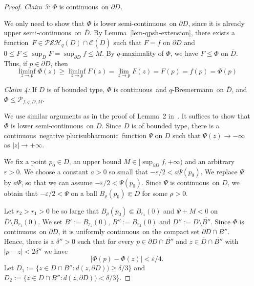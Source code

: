 \documentclass[reqno]{amsart}
\theoremstyle{definition}
\numberwithin{equation}{section}
\newcommand{\TP}[1]{\textcolor{red}{[#1]}}
\newcommand{\ccal}{\mathcal{C}}
\newcommand{\pcal}{\mathcal{P}}
\newcommand{\qbrem}{$q$-Bremermann}
\newcommand{\psh}{pluri\-sub\-harmonic}
\newcommand{\qpsh}{$q$-pluri\-sub\-harmonic}
\newcommand{\PSH}{\mathcal{PSH}}
\newcommand{\cl}[1]{\overline{#1}}
\newcommand{\cont}{continuous}
\newcommand{\usc}{upper semi-continuous}
\newcommand{\lsc}{lower semi-continuous}
\newcommand{\fct}{function}
\newcommand{\cld}{\overline{D}}
\newcommand{\relc}{\Subset}
\newcommand{\eps}{\varepsilon}
\begin{document}
\begin{proof}
\medskip

\textit{Claim 3:} $\Phi$ is \cont\ on $\partial D$.

\medskip

We only need to show that $\Phi$ is \lsc\ on $\partial D$, since it is already \usc\ on $\cld$. By Lemma~\ref{lem-qpsh-extension}, there exists a \fct\ $F \in \PSH_q(D)\cap\ccal(\cld)$ such that $F=f$ on $\partial D$ and $0 \leq F \leq \sup_{\cld} F = \sup_{\partial D} f \leq M$. By $q$-maximality of $\Phi$, we have $F\leq\Phi$ on $\cld$. Thus, if $p \in \partial D$, then
\[
\liminf_{z \to p} \Phi(z) \geq \liminf_{z \to p} F(z) = \lim_{z \to p} F(z) = F(p)=f(p)=\Phi(p)
\]




\medskip

\textit{Claim 4:} If $D$ is of bounded type, $\Phi$ is \cont\ and \qbrem\ on $\cl D$, and $\Phi \leq\pcal_{f,q,D,M}$.

\medskip

We use similar arguments as in the proof of Lemma~2 in~\cite{SiTo}. It suffices to show that $\Phi$ is \lsc\ on $D$. Since $D$ is of bounded type, there is a \cont\ negative \psh\ function $\Psi$ on $D$ such that $\Psi(z) \to -\infty$ as $|z|\to+\infty$.

We fix a point $p_0 \in D$, an upper bound $M \in [\sup_{\partial D} f,+\infty)$ and an arbitrary $\eps>0$. We choose a constant $a>0$ so small that $-\eps/2 < a\Psi(p_0)$. We replace $\Psi$ by $a\Psi$, so that we can assume $-\eps/2 < \Psi(p_0)$. Since $\Psi$ is \cont\ on $D$, we obtain that $-\eps/2 < \Psi$ on a ball $B_{\rho}(p_0) \relc D$ for some $\rho>0$.

Let $r_2>r_1>0$ be so large that $B_{\rho}(p_0) \relc B_{r_1}(0)$ and $\Psi +M < 0$ on $\cld \setminus B_{r_1}(0)$. We set $B':=B_{r_1}(0)$, $B'':=B_{r_2}(0)$ and $D'':=D\setminus \cl{B''}$.
Since $\Phi$ is \cont\ on $\partial D$, it is uniformly \cont\ on the compact set $\partial D \cap \cl{B''}$. Hence, there is a $\delta''>0$ such that for every $p \in \partial D \cap \cl{B''}$ and $z \in \cld \cap \cl{B''}$ with $|p-z|<2\delta''$ we have
\[
|\Phi(p) - \Phi(z)| < \eps/4.
\]
Let $D_1:=\{z \in D \cap B'' : d(z,\partial D)) \geq \delta/3\}$ and $D_2:=\{z \in D \cap B'' : d(z,\partial D)) < \delta/3\}$.



\end{proof}
\end{document}
